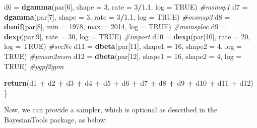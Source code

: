 \documentclass[12pt,]{article}
\newenvironment{Shaded}{\begin{snugshade}}{\end{snugshade}}
\newcommand{\CommentTok}[1]{\textcolor[rgb]{0.56,0.35,0.01}{\textit{#1}}}
\newcommand{\DataTypeTok}[1]{\textcolor[rgb]{0.13,0.29,0.53}{#1}}
\newcommand{\DecValTok}[1]{\textcolor[rgb]{0.00,0.00,0.81}{#1}}
\newcommand{\FloatTok}[1]{\textcolor[rgb]{0.00,0.00,0.81}{#1}}
\newcommand{\KeywordTok}[1]{\textcolor[rgb]{0.13,0.29,0.53}{\textbf{#1}}}
\newcommand{\NormalTok}[1]{#1}
\newcommand{\OperatorTok}[1]{\textcolor[rgb]{0.81,0.36,0.00}{\textbf{#1}}}
\newcommand{\OtherTok}[1]{\textcolor[rgb]{0.56,0.35,0.01}{#1}}
\newcommand{\StringTok}[1]{\textcolor[rgb]{0.31,0.60,0.02}{#1}}
\begin{document}
\begin{Shaded}
\begin{Highlighting}[]
\NormalTok{  d6 =}\StringTok{ }\KeywordTok{dgamma}\NormalTok{(par[}\DecValTok{6}\NormalTok{], }\DataTypeTok{shape =} \DecValTok{3}\NormalTok{, }\DataTypeTok{rate =} \DecValTok{3}\OperatorTok{/}\FloatTok{1.1}\NormalTok{, }\DataTypeTok{log =} \OtherTok{TRUE}\NormalTok{) }\CommentTok{#msmsp1}
\NormalTok{  d7 =}\StringTok{ }\KeywordTok{dgamma}\NormalTok{(par[}\DecValTok{7}\NormalTok{], }\DataTypeTok{shape =} \DecValTok{3}\NormalTok{, }\DataTypeTok{rate =} \DecValTok{3}\OperatorTok{/}\FloatTok{1.1}\NormalTok{, }\DataTypeTok{log =} \OtherTok{TRUE}\NormalTok{) }\CommentTok{#msmsp2}
\NormalTok{  d8 =}\StringTok{ }\KeywordTok{dunif}\NormalTok{(par[}\DecValTok{8}\NormalTok{], }\DataTypeTok{min =} \DecValTok{1978}\NormalTok{, }\DataTypeTok{max =} \DecValTok{2014}\NormalTok{, }\DataTypeTok{log =} \OtherTok{TRUE}\NormalTok{) }\CommentTok{#msmsploc}
\NormalTok{  d9 =}\StringTok{ }\KeywordTok{dexp}\NormalTok{(par[}\DecValTok{9}\NormalTok{], }\DataTypeTok{rate =} \DecValTok{30}\NormalTok{, }\DataTypeTok{log =} \OtherTok{TRUE}\NormalTok{) }\CommentTok{#import}
\NormalTok{  d10 =}\StringTok{ }\KeywordTok{dexp}\NormalTok{(par[}\DecValTok{10}\NormalTok{], }\DataTypeTok{rate =} \DecValTok{20}\NormalTok{, }\DataTypeTok{log =} \OtherTok{TRUE}\NormalTok{) }\CommentTok{#srcNe}
\NormalTok{  d11 =}\StringTok{ }\KeywordTok{dbeta}\NormalTok{(par[}\DecValTok{11}\NormalTok{], }\DataTypeTok{shape1 =} \DecValTok{16}\NormalTok{, }\DataTypeTok{shape2 =} \DecValTok{4}\NormalTok{, }\DataTypeTok{log =} \OtherTok{TRUE}\NormalTok{) }\CommentTok{#pmsm2msm}
\NormalTok{  d12 =}\StringTok{ }\KeywordTok{dbeta}\NormalTok{(par[}\DecValTok{12}\NormalTok{], }\DataTypeTok{shape1 =} \DecValTok{16}\NormalTok{, }\DataTypeTok{shape2 =} \DecValTok{4}\NormalTok{, }\DataTypeTok{log =} \OtherTok{TRUE}\NormalTok{) }\CommentTok{#pgpf2gpm}

  \KeywordTok{return}\NormalTok{(d1 }\OperatorTok{+}\StringTok{ }\NormalTok{d2 }\OperatorTok{+}\StringTok{ }\NormalTok{d3 }\OperatorTok{+}\StringTok{ }\NormalTok{d4 }\OperatorTok{+}\StringTok{ }\NormalTok{d5 }\OperatorTok{+}\StringTok{ }\NormalTok{d6 }\OperatorTok{+}\StringTok{ }\NormalTok{d7 }\OperatorTok{+}\StringTok{ }\NormalTok{d8 }\OperatorTok{+}\StringTok{ }\NormalTok{d9 }\OperatorTok{+}\StringTok{ }\NormalTok{d10 }\OperatorTok{+}\StringTok{ }\NormalTok{d11 }\OperatorTok{+}\StringTok{ }\NormalTok{d12)}
\NormalTok{\}}
\end{Highlighting}
\end{Shaded}

Now, we can provide a sampler, which is optional as described in the
BayesianTools package, as below:
\end{document}
